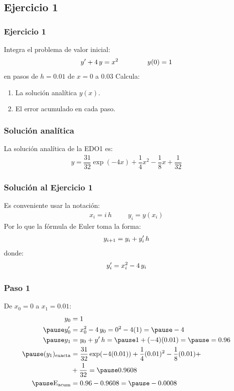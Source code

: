 \documentclass[12pt]{beamer}
\begin{document}
\subsection{Ejercicio 1}

\begin{frame}
\frametitle{Ejercicio 1}
Integra el problema de valor inicial:
\pause
\begin{align*}
{y}^{\prime} + 4 \, y = x^{2} \hspace{1.5cm} y(0) = 1
\end{align*}
en pasos de $h = 0.01$ de $x = 0$ a $0.03$
\pause
Calcula:
\begin{enumerate}[<+->]
\item La solución analítica $y (x)$.
\item El error acumulado en cada paso.
\end{enumerate}
\end{frame}
\begin{frame}
\frametitle{Solución analítica}
La solución analítica de la EDO1 es:
\pause
\begin{align*}
y =  \dfrac{31}{32} \exp(-4 x) + \dfrac{1}{4} x^{2} - \dfrac{1}{8} x + \dfrac{1}{32}
\end{align*}
\end{frame}
\begin{frame}
\frametitle{Solución al Ejercicio 1}
Es conveniente usar la notación:
\pause
\begin{align*}
x_{i} = i \, h \hspace{1cm} y_{i} = y (x_{i})
\end{align*}
\pause
Por lo que la fórmula de Euler toma la forma:
\pause
\begin{align*}
y_{i+1} = y_{i} + {y}^{\prime}_{i} \, h
\end{align*}
donde:
\begin{align*}
{y}^{\prime}_{i} = x_{i}^{2} - 4 \, y_{i}
\end{align*}
\end{frame}
\begin{frame}
\frametitle{Paso 1}
De $x_{0} = 0$ a $x_{1} = 0.01$:
\pause
\begin{eqnarray*}
\begin{aligned}
y_{0} &= 1 \\ \pause
\pderivada{y}_{0} &= x_{0}^{2} - 4 \, y_{0} = 0^{2} - 4 (1) = \pause - 4 \\ \pause
y_{1} &= y_{0} + \pderivada{y} \, h = \pause 1 + (-4)(0.01) = \pause = 0.96 \\ \pause
(y_{1})_{\text{exacta}} &= \dfrac{31}{32} \exp(-4 (0.01)) + \dfrac{1}{4} (0.01)^{2} - \dfrac{1}{8} (0.01) +  \\
&+ \dfrac{1}{32} = \pause 0.9608 \\ \pause
\text{E}_{\text{acum}} &= 0.96 - 0.9608 = \pause -0.0008
\end{aligned}
\end{eqnarray*}
\end{frame}
\end{document}
